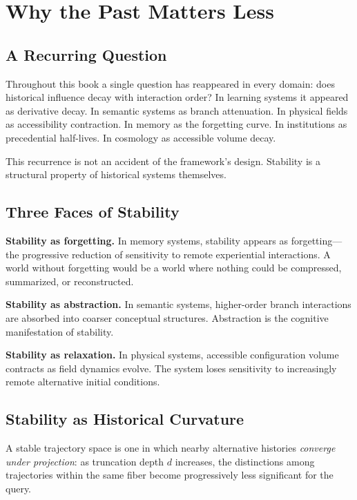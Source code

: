 \chapter{Why the Past Matters Less}

\section{A Recurring Question}

Throughout this book a single question has reappeared in every domain: does historical influence decay with interaction order? In learning systems it appeared as derivative decay. In semantic systems as branch attenuation. In physical fields as accessibility contraction. In memory as the forgetting curve. In institutions as precedential half-lives. In cosmology as accessible volume decay.

This recurrence is not an accident of the framework's design. Stability is a structural property of historical systems themselves.

\section{Three Faces of Stability}

\textbf{Stability as forgetting.} In memory systems, stability appears as forgetting---the progressive reduction of sensitivity to remote experiential interactions. A world without forgetting would be a world where nothing could be compressed, summarized, or reconstructed.

\textbf{Stability as abstraction.} In semantic systems, higher-order branch interactions are absorbed into coarser conceptual structures. Abstraction is the cognitive manifestation of stability.

\textbf{Stability as relaxation.} In physical systems, accessible configuration volume contracts as field dynamics evolve. The system loses sensitivity to increasingly remote alternative initial conditions.

\section{Stability as Historical Curvature}

A stable trajectory space is one in which nearby alternative histories \emph{converge under projection}: as truncation depth $d$ increases, the distinctions among trajectories within the same fiber become progressively less significant for the query.

